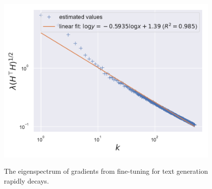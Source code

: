 \begin{figure}[thb]
\begin{center}
\begin{minipage}[t]{0.45\linewidth}
\centering
{\includegraphics[width=0.98\textwidth]{figs/privlm/gpt2/eigenvalue-linfit.pdf}}
\end{minipage}
\end{center}
\caption{
The eigenspectrum of gradients from fine-tuning for text generation rapidly decays.
}
\label{fig:gpt2}
\end{figure}
